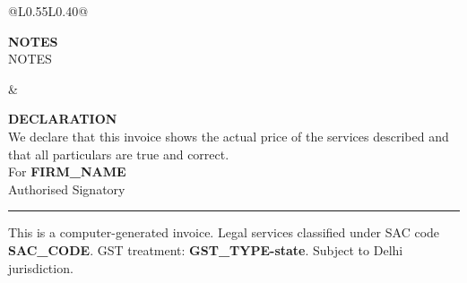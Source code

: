 \documentclass[11pt,a4paper]{article}
\begin{document}
\begin{tabular}{@{}L{0.55\textwidth}L{0.40\textwidth}@{}}
  \begin{minipage}[t]{0.53\textwidth}
    {\small\bfseries\color{textSecondary} NOTES}\\[4pt]
    {\small {{NOTES}}}
  \end{minipage}
  &
  \begin{minipage}[t]{0.38\textwidth}
    {\small\bfseries\color{textSecondary} DECLARATION}\\[4pt]
    {\footnotesize We declare that this invoice shows the actual price of the services described
    and that all particulars are true and correct.}\\[8pt]
    {\small For \textbf{{{FIRM_NAME}}}}\\[16pt]
    {\small Authorised Signatory}
  \end{minipage}
\end{tabular}

\vspace{3mm}
{\color{borderGray}\rule{\textwidth}{0.4pt}}

{\footnotesize\color{textSecondary}
This is a computer-generated invoice. Legal services classified under SAC code \textbf{{{SAC_CODE}}}.
GST treatment: \textbf{{{GST_TYPE}}-state}.
Subject to Delhi jurisdiction.
}
\end{document}
